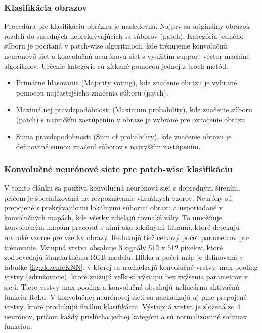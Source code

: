 \subsubsection*{Klasifikácia obrazov}
\hspace{10mm}Procedúra pre klasifikáciu obrázku je nasledovná. Najprv sa originálny obrázok rozdelí do susedných neprekrývajúcich sa súborov (patch). Kategória jedného súboru je počítaná v patch-wise algoritmoch, kde trénujeme konvolučnú neurónovú sieť a konvolučnú neurónovú sieť s využitím support vector machine algoritmov. Určenie kategórie sú získané pomocou jednej z troch metód. 
\begin{itemize}
    \item Primárne hlasovanie (Majority voting), kde značenie obrazu je vybrané pomocou najčastejšieho značenia súboru (patch).
    \item Maximálnej pravdepodobnosti (Maximum probability), kde značenie súboru (patch) s najväčším zastúpením v obraze je vybrané pre označenie obrazu.
	\item Suma pravdepodobnosti (Sum of probability), kde značenie obrazu je definované sumou značení súborov s najvyšším zastúpením.
\end{itemize}

\subsubsection*{Konvolučné neurónové siete pre patch-wise klasifikáciu}
\hspace{10mm}V tomto článku sa používa konvolučná neurónová sieť s dopredným šírením, pričom je špecializovaná na rozpoznávanie vizuálnych vzorov. Neuróny sú prepojené s prekrývajúcimi lokálnymi súbormi obrazu a usporiadané v konvolučných mapách, kde všetky zdieľajú rovnaké váhy. To umožňuje konvolučným mapám pracovať s nimi ako lokálnymi filtrami, ktoré detekujú rovnaké vzorce pre všetky obrazy. Redukujú tiež  celkový počet parametrov pre trénovanie. Vstupná vrstva obsahuje 3 signály 512 x 512 pixelov, ktoré zodpovedajú štandartnému RGB modelu. Hĺbka a počet máp je definovaná v tabuľke \ref{fig:zlozenieKNN}, v ktorej sa nachádzajú konvolučné vrstvy, max-pooling vrstvy (združovacie), ktoré znižujú veľkosť výstupu bez zvýšenia parametrov v sieti. Tieto vrstvy max-pooling a konvolučná obsahujú nelineárnu aktivačnú funkciu ReLu. V konvolučnej neurónovej sieti sa nachádzajú aj plne prepojené vrstvy, ktoré produkujú finálnu klasifikáciu. Výstupná vrstva je zložená zo 4 neurónov, pričom každý prislúcha jednej kategórii  a sú normalizované softmax funkciou.
 
